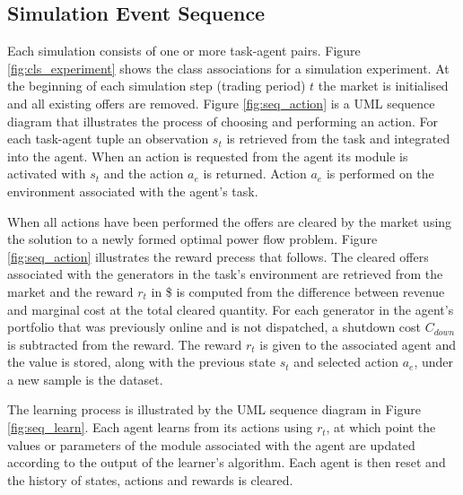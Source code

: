 \subsection{Simulation Event Sequence}
Each simulation consists of one or more task-agent pairs.  Figure
\ref{fig:cls_experiment} shows the class associations for a simulation
experiment.  At the beginning of each simulation step (trading period) $t$ the
market is initialised and all existing offers are removed.  Figure
\ref{fig:seq_action} is a UML sequence diagram that illustrates the process of
choosing and performing an action.  For each task-agent tuple an observation
$s_t$ is retrieved from the task and integrated into the agent.  When an action
is requested from the agent its module is activated with $s_t$ and the action
$a_e$ is returned.  Action $a_e$ is performed on the environment associated with
the agent's task.


When all actions have been performed the offers are cleared by the market using
the solution to a newly formed optimal power flow problem.  Figure
\ref{fig:seq_action} illustrates the reward precess that follows.  The cleared offers associated with
the generators in the task's environment are retrieved from the market and the
reward $r_t$ in \$ is computed from the difference between revenue and marginal
cost at the total cleared quantity.  For each generator in the agent's portfolio
that was previously online and is not dispatched, a shutdown cost $C_{down}$ is
subtracted from the reward.
The reward $r_t$ is given to the associated agent and the value is stored, along
with the previous state $s_t$ and selected action $a_e$, under a new sample is
the dataset.


The learning process is illustrated by the UML sequence diagram in Figure
\ref{fig:seq_learn}.  Each agent learns from its actions using $r_t$, at which
point the values or parameters of the module associated with the agent are
updated according to the output of the learner's algorithm.  Each agent is then
reset and the history of states, actions and rewards is cleared.

